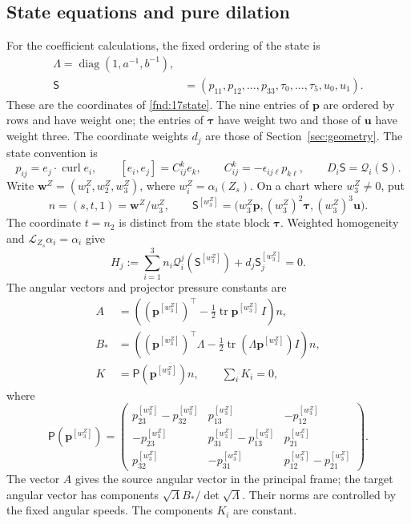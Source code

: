 \documentclass[11pt,a4paper]{article}
\numberwithin{equation}{section}
\theoremstyle{plain}
\theoremstyle{definition}
\theoremstyle{remark}
\begin{document}
\subsection{State equations and pure dilation}

\label{adil:state-order}
For the coefficient calculations, the fixed ordering of the state is
\[
 \begin{aligned}
 \Lambda=\operatorname{diag}(1,a^{-1},b^{-1}),\\
 \mathsf S&=(p_{11},p_{12},\ldots,p_{33},\tau_0,\ldots,\tau_5,u_0,u_1).
 \end{aligned}
\]
These are the coordinates of \eqref{fnd:17state}. The nine entries
of $\boldsymbol p$ are ordered by rows and have weight one; the entries of
$\boldsymbol\tau$ have weight two and those of $\boldsymbol u$ have weight three.
The coordinate weights $d_j$ are those of Section~\ref{sec:geometry}.
The state convention is
\begin{equation}\label{dil:state-convention}
 p_{ij}=e_j\cdot\operatorname{curl}e_i,
 \qquad [e_i,e_j]=C^k_{ij}e_k,
 \qquad C^k_{ij}=-\epsilon_{ij\ell}p_{k\ell},
 \qquad D_i\mathsf S=\mathcal Q_i(\mathsf S).
\end{equation}
Write $\mathbf w^Z=(w_1^Z,w_2^Z,w_3^Z)$, where
$w_i^Z=\alpha_i(Z_s)$. On a chart where $w_3^Z\ne0$, put
\[
 n=(s,t,1)=\mathbf w^Z/w_3^Z,\qquad
 \mathsf S^{[w_3^Z]}=\bigl(w_3^Z\boldsymbol p,(w_3^Z)^2\boldsymbol\tau,(w_3^Z)^3\boldsymbol u\bigr).
\]
The coordinate $t=n_2$ is distinct from the state block
$\boldsymbol\tau$. Weighted homogeneity and
$\mathcal L_{Z_s}\alpha_i=\alpha_i$ give
\begin{equation}\label{dil:H17}
 H_j:=\sum_{i=1}^3 n_i\mathcal Q_i^j(\mathsf S^{[w_3^Z]})+d_j\mathsf S^{[w_3^Z]}_j=0.
\end{equation}
The angular vectors and projector pressure constants are
\begin{equation}\label{dil:observations}
 \begin{aligned}
 A&=((\boldsymbol p^{[w_3^Z]})^{\top}-\tfrac12\operatorname{tr}\boldsymbol p^{[w_3^Z]}\,I)n,\\
 B_*&=((\boldsymbol p^{[w_3^Z]})^{\top}\Lambda-\tfrac12\operatorname{tr}(\Lambda\boldsymbol p^{[w_3^Z]})I)n,\\
 K&=\mathsf P(\boldsymbol p^{[w_3^Z]})n,\qquad \sum_iK_i=0,
 \end{aligned}
\end{equation}
where
\begin{equation}\label{dil:pressure-matrix}
 \mathsf P(\boldsymbol p^{[w_3^Z]})=
 \begin{pmatrix}
 p_{23}^{[w_3^Z]}-p_{32}^{[w_3^Z]}&p_{13}^{[w_3^Z]}&-p_{12}^{[w_3^Z]}\\
 -p_{23}^{[w_3^Z]}&p_{31}^{[w_3^Z]}-p_{13}^{[w_3^Z]}&p_{21}^{[w_3^Z]}\\
 p_{32}^{[w_3^Z]}&-p_{31}^{[w_3^Z]}&p_{12}^{[w_3^Z]}-p_{21}^{[w_3^Z]}
 \end{pmatrix}.
\end{equation}
The vector $A$ gives the source angular vector in the principal
frame; the target angular vector has components
$\sqrt\Lambda B_*/\det\sqrt\Lambda$. Their norms are controlled by
the fixed angular speeds. The components $K_i$ are constant.
\end{document}
